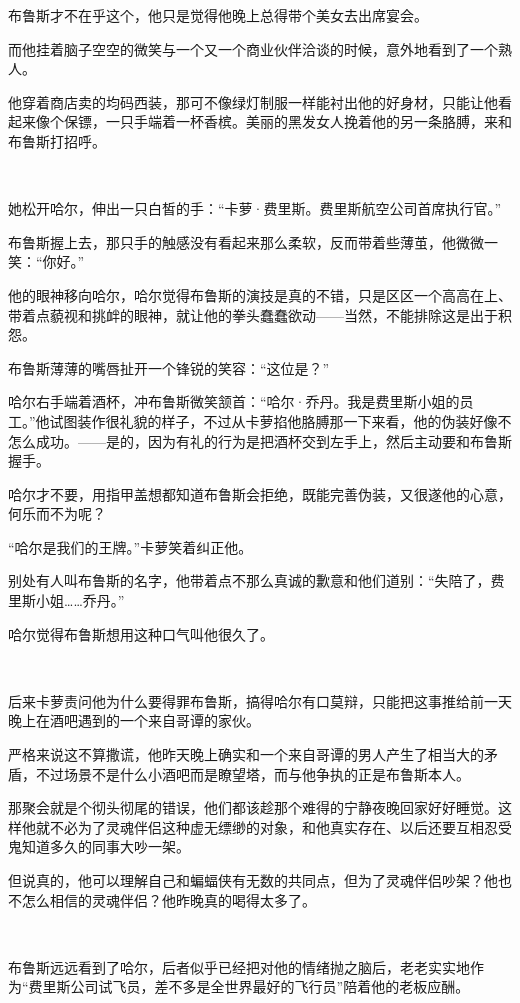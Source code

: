 \documentclass[../main.tex]{subfiles}
\begin{document}
布鲁斯才不在乎这个，他只是觉得他晚上总得带个美女去出席宴会。

而他挂着脑子空空的微笑与一个又一个商业伙伴洽谈的时候，意外地看到了一个熟人。

他穿着商店卖的均码西装，那可不像绿灯制服一样能衬出他的好身材，只能让他看起来像个保镖，一只手端着一杯香槟。美丽的黑发女人挽着他的另一条胳膊，来和布鲁斯打招呼。

~\

她松开哈尔，伸出一只白皙的手：“卡萝·费里斯。费里斯航空公司首席执行官。”

布鲁斯握上去，那只手的触感没有看起来那么柔软，反而带着些薄茧，他微微一笑：“你好。”

他的眼神移向哈尔，哈尔觉得布鲁斯的演技是真的不错，只是区区一个高高在上、带着点藐视和挑衅的眼神，就让他的拳头蠢蠢欲动——当然，不能排除这是出于积怨。

布鲁斯薄薄的嘴唇扯开一个锋锐的笑容：“这位是？”

哈尔右手端着酒杯，冲布鲁斯微笑颔首：“哈尔·乔丹。我是费里斯小姐的员工。”他试图装作很礼貌的样子，不过从卡萝掐他胳膊那一下来看，他的伪装好像不怎么成功。——是的，因为有礼的行为是把酒杯交到左手上，然后主动要和布鲁斯握手。

哈尔才不要，用指甲盖想都知道布鲁斯会拒绝，既能完善伪装，又很遂他的心意，何乐而不为呢？

“哈尔是我们的王牌。”卡萝笑着纠正他。

别处有人叫布鲁斯的名字，他带着点不那么真诚的歉意和他们道别：“失陪了，费里斯小姐……乔丹。”

哈尔觉得布鲁斯想用这种口气叫他很久了。

~\

后来卡萝责问他为什么要得罪布鲁斯，搞得哈尔有口莫辩，只能把这事推给前一天晚上在酒吧遇到的一个来自哥谭的家伙。

严格来说这不算撒谎，他昨天晚上确实和一个来自哥谭的男人产生了相当大的矛盾，不过场景不是什么小酒吧而是瞭望塔，而与他争执的正是布鲁斯本人。

那聚会就是个彻头彻尾的错误，他们都该趁那个难得的宁静夜晚回家好好睡觉。这样他就不必为了灵魂伴侣这种虚无缥缈的对象，和他真实存在、以后还要互相忍受鬼知道多久的同事大吵一架。

但说真的，他可以理解自己和蝙蝠侠有无数的共同点，但为了灵魂伴侣吵架？他也不怎么相信的灵魂伴侣？他昨晚真的喝得太多了。

~\

布鲁斯远远看到了哈尔，后者似乎已经把对他的情绪抛之脑后，老老实实地作为“费里斯公司试飞员，差不多是全世界最好的飞行员”陪着他的老板应酬。
\end{document}
